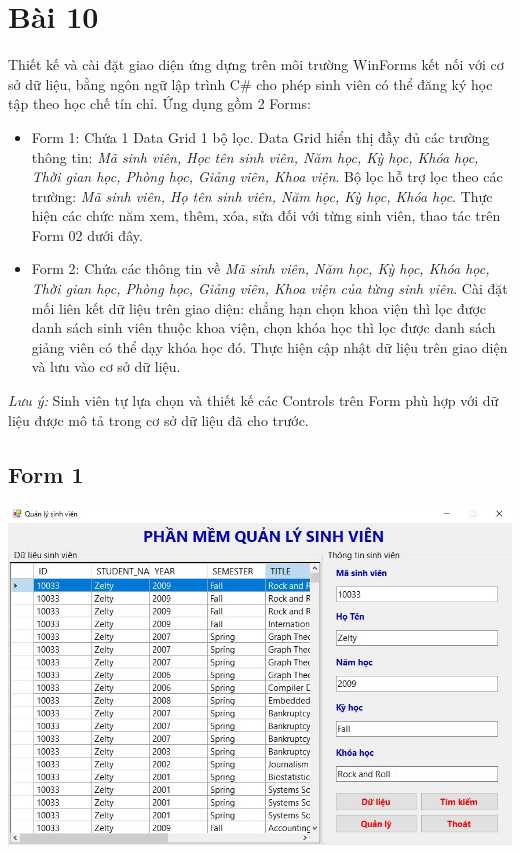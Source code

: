 \documentclass[12pt,a4paper]{report}
\begin{document}
\section{Bài 10}
\begin{boxedminipage}[t]{15.5cm}
	Thiết kế và cài đặt giao diện ứng dựng trên môi trường WinForms kết nối với cơ sở dữ liệu, bằng ngôn ngữ lập trình C\# cho phép sinh viên có thể đăng ký học tập theo học chế tín chỉ. Ứng dụng gồm 2 Forms:
	\begin{itemize}
		\item Form 1: Chứa 1 Data Grid 1 bộ lọc. Data Grid hiển thị đầy đủ các trường thông tin:
		\textit{Mã sinh viên, Học tên sinh viên, Năm học, Kỳ học, Khóa học, Thời gian học, Phòng học, Giảng viên, Khoa viện}. Bộ lọc hỗ trợ lọc theo các trường: \textit{Mã sinh viên, Họ tên sinh viên, Năm học, Kỳ học, Khóa học}. Thực hiện các chức năm xem, thêm, xóa, sửa đối với từng sinh viên, thao tác trên Form 02 dưới đây.
		\item Form 2:
		Chứa các thông tin về \textit{Mã sinh viên, Năm học, Kỳ học, Khóa học, Thời gian học, Phòng học, Giảng viên, Khoa viện của từng sinh viên}. Cài đặt mối liên kết dữ liệu trên giao diện: chẳng hạn chọn khoa viện thì lọc được danh sách sinh viên thuộc khoa viện, chọn khóa học thì lọc được danh sách giảng viên có thể dạy khóa học đó. Thực hiện cập nhật dữ liệu trên giao diện và lưu vào cơ sở dữ liệu.
	\end{itemize}	\textit{Lưu ý:} Sinh viên tự lựa chọn và thiết kế các Controls trên Form phù hợp với dữ liệu được mô tả trong cơ sở dữ liệu đã cho trước.
\end{boxedminipage}

\subsection{Form 1}
\includegraphics[scale=.65]{form1}
\end{document}
